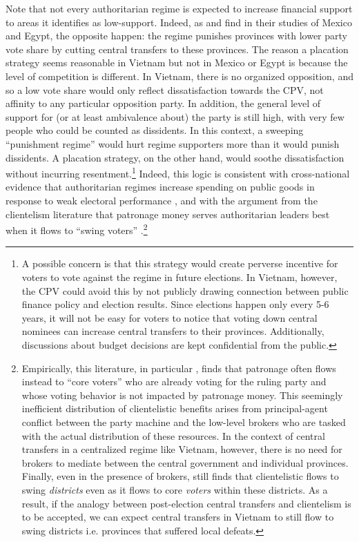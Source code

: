 \documentclass[12pt]{article}
\newcommand{\1}{\mathbbm{1}}
\begin{document}
Note that not every authoritarian regime is expected to increase financial support to areas it identifies as low-support. Indeed, as \cite{Magaloni2006} and \cite{Blaydes2008} find in their studies of Mexico and Egypt, the opposite happen: the regime punishes provinces with lower party vote share by cutting central transfers to these provinces. The reason a placation strategy seems reasonable in Vietnam but not in Mexico or Egypt is because the level of competition is different. In Vietnam, there is no organized opposition, and so a low vote share would only reflect dissatisfaction towards the CPV, not affinity to any particular opposition party. In addition, the general level of support for (or at least ambivalence about) the party is still high, with very few people who could be counted as dissidents. In this context, a sweeping ``punishment regime'' \citep{Magaloni2006} would hurt regime supporters more than it would punish dissidents. A  placation strategy, on the other hand, would soothe dissatisfaction without incurring resentment.\footnote{A possible concern is that this strategy would create perverse incentive for voters to vote against the regime in future elections. In Vietnam, however, the CPV could avoid this by not publicly drawing connection between public finance policy and election results. Since elections happen only every 5-6 years, it will not be easy for voters to notice that voting down central nominees can increase central transfers to their provinces. Additionally, discussions about budget decisions are kept confidential from the public.} Indeed, this logic is consistent with cross-national evidence that authoritarian regimes increase spending on public goods in response to weak electoral performance \citep{Miller2015}, and with the argument from the clientelism literature that patronage money serves authoritarian leaders best when it flows to ``swing voters'' \citep{DixitLondregan1996, Stokes2013}.\footnote{Empirically, this literature, in particular \cite{Stokes2013}, finds that patronage often flows instead to ``core voters'' who are already voting for the ruling party and whose voting behavior is not impacted by patronage money. This seemingly inefficient distribution of clientelistic benefits arises from principal-agent conflict between the party machine and the low-level brokers who are tasked with the actual distribution of these resources. In the context of central transfers in a centralized regime like Vietnam, however, there is no need for brokers to mediate between the central government and individual provinces. Finally, even in the presence of brokers, \cite{Stokes2013} still finds that clientelistic flows to swing \textit{districts} even as it flows to core \textit{voters} within these districts. As a result, if the analogy between post-election central transfers and clientelism is to be accepted, we can expect central transfers in Vietnam to still flow to swing districts i.e. provinces that suffered local defeats.} 
\end{document}

